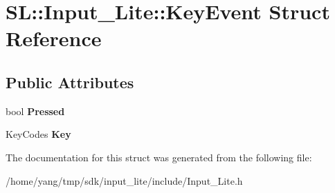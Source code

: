 \hypertarget{struct_s_l_1_1_input___lite_1_1_key_event}{}\section{SL\+:\+:Input\+\_\+\+Lite\+:\+:Key\+Event Struct Reference}
\label{struct_s_l_1_1_input___lite_1_1_key_event}
\subsection*{Public Attributes}
\begin{DoxyCompactItemize}
\item 
bool {\bfseries Pressed}\hypertarget{struct_s_l_1_1_input___lite_1_1_key_event_a348aa5162a77e06c0dfcbe4295779b78}{}\label{struct_s_l_1_1_input___lite_1_1_key_event_a348aa5162a77e06c0dfcbe4295779b78}

\item 
Key\+Codes {\bfseries Key}\hypertarget{struct_s_l_1_1_input___lite_1_1_key_event_aced05bab9c975ad4c8a01a832b737230}{}\label{struct_s_l_1_1_input___lite_1_1_key_event_aced05bab9c975ad4c8a01a832b737230}

\end{DoxyCompactItemize}


The documentation for this struct was generated from the following file\+:\begin{DoxyCompactItemize}
\item 
/home/yang/tmp/sdk/input\+\_\+lite/include/Input\+\_\+\+Lite.\+h\end{DoxyCompactItemize}

